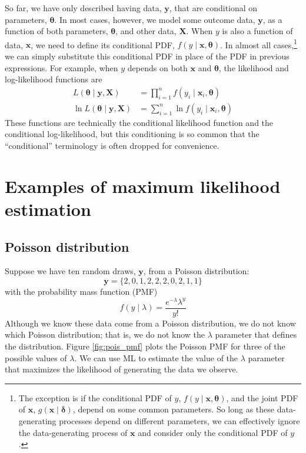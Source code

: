 \documentclass[11pt,letterpaper]{article}
\begin{document}
\noindent So far, we have only described having data, $\bm{y}$, that are conditional on parameters, $\bm{\theta}$. In most cases, however, we model some outcome data, $\bm{y}$, as a function of both parameters, $\bm{\theta}$, and other data, $\bm{X}$. When $y$ is also a function of data, $\bm{x}$, we need to define its conditional PDF, $f(y \mid \bm{x}, \bm{\theta})$. In almost all cases,\footnote{The exception is if the conditional PDF of $y$, $f(y \mid \bm{x}, \bm{\theta})$, and the joint PDF of $\bm{x}$, $g(\bm{x} \mid \bm{\delta})$, depend on some common parameters. So long as these data-generating processes depend on different parameters, we can effectively ignore the data-generating process of $\bm{x}$ and consider only the conditional PDF of $y$.} we can simply substitute this conditional PDF in place of the PDF in previous expressions. For example, when $y$ depends on both $\bm{x}$ and $\bm{\theta}$, the likelihood and log-likelihood functions are
\begin{align*}
  L(\bm{\theta} \mid \bm{y}, \bm{X}) & = \prod_{i = 1}^n f(y_i \mid \bm{x}_i, \bm{\theta}) \\
  \ln L(\bm{\theta} \mid \bm{y}, \bm{X}) & = \sum_{i = 1}^n \ln f(y_i \mid \bm{x}_i, \bm{\theta})
\end{align*}
These functions are technically the conditional likelihood function and the conditional log-likelihood, but this conditioning is so common that the ``conditional'' terminology is often dropped for convenience.

\section{Examples of maximum likelihood estimation}

\subsection{Poisson distribution}

Suppose we have ten random draws, $\bm{y}$, from a Poisson distribution:
$$\bm{y} = \{ 2, 0, 1, 2, 2, 2, 0, 2, 1, 1 \}$$
with the probability mass function (PMF)
$$f(y \mid \lambda) = \frac{e^{-\lambda} \lambda^y }{y!}$$
Although we know these data come from a Poisson distribution, we do not know which Poisson distribution; that is, we do not know the $\lambda$ parameter that defines the distribution. Figure \ref{fig:pois_pmf} plots the Poisson PMF for three of the possible values of $\lambda$. We can use ML to estimate the value of the $\lambda$ parameter that maximizes the likelihood of generating the data we observe. \\
\end{document}

